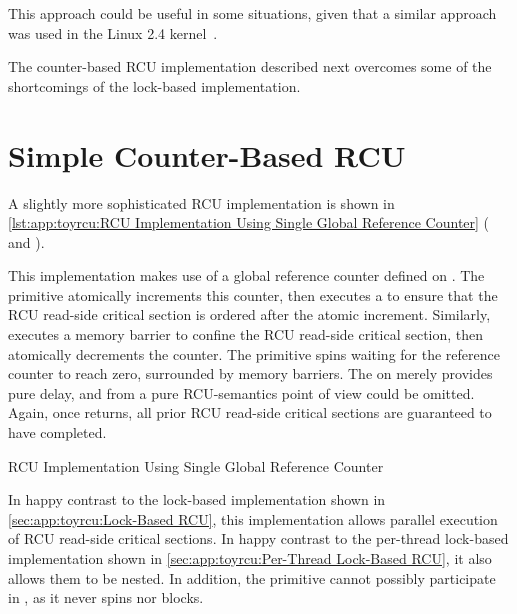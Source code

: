 This approach could be useful in some situations, given that a similar
approach was used in the
Linux 2.4 kernel~\cite{Molnar00a}.

The counter-based RCU implementation described next overcomes some of
the shortcomings of the lock-based implementation.

\section{Simple Counter-Based RCU}
\label{sec:app:toyrcu:Simple Counter-Based RCU}

A slightly more sophisticated RCU implementation is shown in
\cref{lst:app:toyrcu:RCU Implementation Using Single Global Reference Counter}
( and ).
\begin{fcvref}
This implementation makes use of a global reference counter
 defined on .
The  primitive atomically increments this
counter, then executes a  to ensure that the
RCU read-side critical section is ordered after the atomic
increment.
Similarly,  executes a memory barrier to
confine the RCU read-side critical section, then atomically
decrements the counter.
The  primitive spins waiting for the reference
counter to reach zero, surrounded by memory barriers.
The  on  merely provides pure delay, and from
a pure RCU-semantics point of view could be omitted.
Again, once  returns, all prior
RCU read-side critical sections are guaranteed to have completed.
\end{fcvref}

\begin{listing}
\vspace*{-11pt}
\caption{RCU Implementation Using Single Global Reference Counter}
\label{lst:app:toyrcu:RCU Implementation Using Single Global Reference Counter}
\end{listing}

In happy contrast to the lock-based implementation shown in
\cref{sec:app:toyrcu:Lock-Based RCU}, this implementation
allows parallel execution of RCU read-side critical sections.
In happy contrast to the per-thread lock-based implementation shown in
\cref{sec:app:toyrcu:Per-Thread Lock-Based RCU},
it also allows them to be nested.
In addition, the  primitive cannot possibly
participate in , as it never spins nor blocks.

